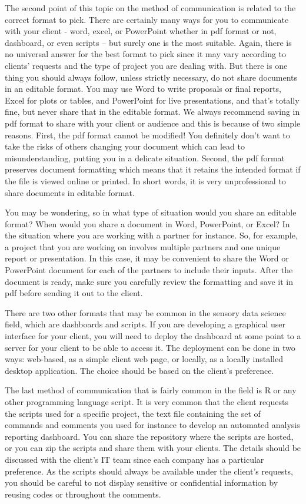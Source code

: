 \documentclass[
]{book}
\begin{document}
The second point of this topic on the method of communication is related to the correct format to pick. There are certainly many ways for you to communicate with your client - word, excel, or PowerPoint whether in pdf format or not, dashboard, or even scripts -- but surely one is the most suitable. Again, there is no universal answer for the best format to pick since it may vary according to clients' requests and the type of project you are dealing with. But there is one thing you should always follow, unless strictly necessary, do not share documents in an editable format. You may use Word to write proposals or final reports, Excel for plots or tables, and PowerPoint for live presentations, and that's totally fine, but never share that in the editable format. We always recommend saving in pdf format to share with your client or audience and this is because of two simple reasons. First, the pdf format cannot be modified! You definitely don't want to take the risks of others changing your document which can lead to misunderstanding, putting you in a delicate situation. Second, the pdf format preserves document formatting which means that it retains the intended format if the file is viewed online or printed. In short words, it is very unprofessional to share documents in editable format.

You may be wondering, so in what type of situation would you share an editable format? When would you share a document in Word, PowerPoint, or Excel? In the situation where you are working with a partner for instance. So, for example, a project that you are working on involves multiple partners and one unique report or presentation. In this case, it may be convenient to share the Word or PowerPoint document for each of the partners to include their inputs. After the document is ready, make sure you carefully review the formatting and save it in pdf before sending it out to the client.

There are two other formats that may be common in the sensory data science field, which are dashboards and scripts. If you are developing a graphical user interface for your client, you will need to deploy the dashboard at some point to a server for your client to be able to access it. The deployment can be done in two ways: web-based, as a simple client web page, or locally, as a locally installed desktop application. The choice should be based on the client's preference.

The last method of communication that is fairly common in the field is R or any other programming language script. It is very common that the client requests the scripts used for a specific project, the text file containing the set of commands and comments you used for instance to develop an automated analysis reporting dashboard. You can share the repository where the scripts are hosted, or you can zip the scripts and share them with your clients. The details should be discussed with the client's IT team since each company has a particular preference. As the scripts should always be available under the client's requests, you should be careful to not display sensitive or confidential information by reusing codes or throughout the comments.
\end{document}
